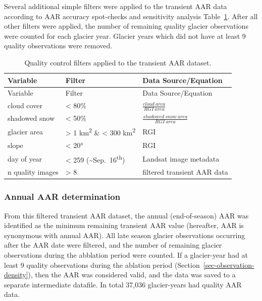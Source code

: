 \documentclass[
]{agujournal2019}
\begin{document}
Several additional simple filters were applied to the transient AAR data
according to AAR accuracy spot-checks and sensitivity analysis
Table~\ref{tbl-filters}. After all other filters were applied, the
number of remaining quality glacier observations were counted for each
glacier year. Glacier years which did not have at least 9 quality
observations were removed.

\begin{longtable}[]{@{}lll@{}}
\caption{Quality control filters applied to the transient AAR
dataset.}\label{tbl-filters}\tabularnewline
\toprule\noalign{}
Variable & Filter & Data Source/Equation \\
\midrule\noalign{}
\endfirsthead
\toprule\noalign{}
Variable & Filter & Data Source/Equation \\
\midrule\noalign{}
\endhead
\bottomrule\noalign{}
\endlastfoot
cloud cover & \textless{} 80\% & \(\frac{cloud\:area}{RGI\:area}\) \\
shadowed snow & \textless{} 50\% &
\(\frac{shadowed\:snow\:area}{RGI\:area}\) \\
glacier area & \textgreater{} 1 km\textsuperscript{2} \& \textless{} 300
km\textsuperscript{2} & RGI \\
slope & \textless{} 20° & RGI \\
day of year & \textless{} 259
(\textasciitilde Sep.~16\textsuperscript{th}) & Landsat image
metadata \\
n quality images & \textgreater{} 8 & filtered transient AAR data \\
\end{longtable}

\subsubsection{Annual AAR determination}\label{sec-aar}

From this filtered transient AAR dataset, the annual (end-of-season) AAR
was identified as the minimum remaining transient AAR value (hereafter,
AAR is synonymous with annual AAR). All late season glacier observations
occurring after the AAR date were filtered, and the number of remaining
glacier observations during the abblation period were counted. If a
glacier-year had at least 9 quality observations during the ablation
period (Section~\ref{sec-observation-density}), then the AAR was
considered valid, and the data was saved to a separate intermediate
datafile. In total 37,036 glacier-years had quality AAR data.
\end{document}
